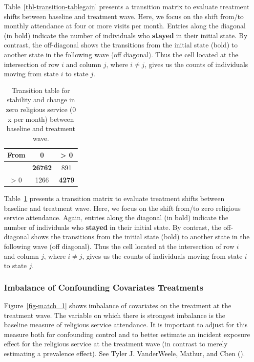 \documentclass[
  single column]{article}
\begin{document}
Table~\ref{tbl-transition-tablegain} presents a transition matrix to
evaluate treatment shifts between baseline and treatment wave. Here, we
focus on the shift from/to monthly attendance at four or more visits per
month. Entries along the diagonal (in bold) indicate the number of
individuals who \textbf{stayed} in their initial state. By contrast, the
off-diagonal shows the transitions from the initial state (bold) to
another state in the following wave (off diagonal). Thus the cell
located at the intersection of row \(i\) and column \(j\), where
\(i \neq j\), gives us the counts of individuals moving from state \(i\)
to state \(j\).

\begin{longtable}[]{@{}ccc@{}}

\caption{\label{tbl-transition-tableloss}Transition table for stability
and change in zero religious service (0 x per month) between baseline
and treatment wave.}

\tabularnewline

\toprule\noalign{}
From & 0 & \textgreater{} 0 \\
\midrule\noalign{}
\endhead
\bottomrule\noalign{}
\endlastfoot
0 & \textbf{26762} & 891 \\
\textgreater{} 0 & 1266 & \textbf{4279} \\

\end{longtable}

Table~\ref{tbl-transition-tableloss} presents a transition matrix to
evaluate treatment shifts between baseline and treatment wave. Here, we
focus on the shift from/to zero religious service attendance. Again,
entries along the diagonal (in bold) indicate the number of individuals
who \textbf{stayed} in their initial state. By contrast, the
off-diagonal shows the transitions from the initial state (bold) to
another state in the following wave (off diagonal). Thus the cell
located at the intersection of row \(i\) and column \(j\), where
\(i \neq j\), gives us the counts of individuals moving from state \(i\)
to state \(j\).

\subsubsection{Imbalance of Confounding Covariates
Treatments}\label{imbalance-of-confounding-covariates-treatments}

Figure~\ref{fig-match_1} shows imbalance of covariates on the treatment
at the treatment wave. The variable on which there is strongest
imbalance is the baseline measure of religious service attendance. It is
important to adjust for this measure both for confounding control and to
better estimate an incident exposure effect for the religious service at
the treatment wave (in contrast to merely estimating a prevalence
effect). See Tyler J. VanderWeele, Mathur, and Chen
().
\end{document}
